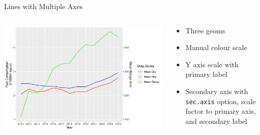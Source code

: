 \documentclass[ignorenonframetext,xcolor=x11names]{beamer}
\begin{document}
\begin{frame}{Lines with Multiple Axes}
\begin{columns}
\begin{column}{.75\textwidth}
  \includegraphics[width=\textwidth]{fuel.linesTwoScales.pdf}
\end{column}
\begin{column}{.35\textwidth}
\footnotesize
\begin{itemize}
   \item Three geoms
   \item Manual colour scale
   \item Y axis scale with primary label
   \item Secondary axis with \texttt{sec.axis} option, scale factor to primary axis, and secondary label
\end{itemize}
\end{column}
\end{columns}
\end{frame}
\end{document}
